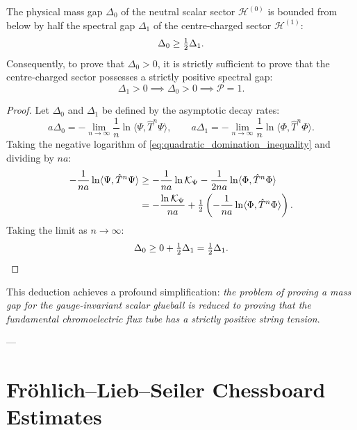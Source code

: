 \begin{corollary}
\label{cor:spectral_domination}
The physical mass gap $\Delta_0$ of the neutral scalar sector $\mathcal{H}^{(0)}$ is bounded from below by half the spectral gap $\Delta_1$ of the centre-charged sector $\mathcal{H}^{(1)}$:
\begin{equation}
\label{eq:gap_domination_bound}
\Delta_0 \ge \tfrac{1}{2} \Delta_1.
\end{equation}
Consequently, to prove that $\Delta_0 > 0$, it is strictly sufficient to prove that the centre-charged sector possesses a strictly positive spectral gap:
\begin{equation}
\Delta_1 > 0 \implies \Delta_0 > 0 \implies \mathcal{P} = 1.
\end{equation}
\end{corollary}

\begin{proof}
Let $\Delta_0$ and $\Delta_1$ be defined by the asymptotic decay rates:
\begin{equation}
a \Delta_0 = -\lim_{n \to \infty} \frac{1}{n} \ln \langle \Psi, \hat{T}^n \Psi \rangle, \qquad a \Delta_1 = -\lim_{n \to \infty} \frac{1}{n} \ln \langle \Phi, \hat{T}^n \Phi \rangle.
\end{equation}
Taking the negative logarithm of \eqref{eq:quadratic_domination_inequality} and dividing by $n a$:
\begin{align}
-\frac{1}{n a} \ln \langle \Psi, \hat{T}^n \Psi \rangle &\ge -\frac{1}{n a} \ln \mathcal{K}_\Psi - \frac{1}{2 n a} \ln \langle \Phi, \hat{T}^n \Phi \rangle \nonumber \\
&= -\frac{\ln \mathcal{K}_\Psi}{n a} + \tfrac{1}{2} \left( -\frac{1}{n a} \ln \langle \Phi, \hat{T}^n \Phi \rangle \right).
\end{align}
Taking the limit as $n \to \infty$:
\begin{equation}
\Delta_0 \ge 0 + \tfrac{1}{2} \Delta_1 = \tfrac{1}{2} \Delta_1. \qedhere
\end{equation}
\end{proof}

This deduction achieves a profound simplification: \emph{the problem of proving a mass gap for the gauge-invariant scalar glueball is reduced to proving that the fundamental chromoelectric flux tube has a strictly positive string tension}.

---

\section{Fr{\"o}hlich--Lieb--Seiler Chessboard Estimates}
\label{sec:chessboard_estimates}

